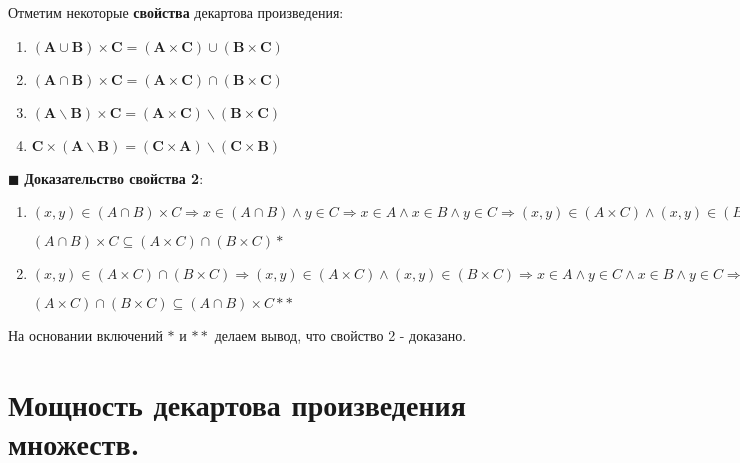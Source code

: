\documentclass[12pt, a4paper, oneside]{article}
\theoremstyle{plain} %
\theoremstyle{definition}
\begin{document}
Отметим некоторые \textbf{свойства} декартова произведения:

\begin{enumerate}
    
    \item \((\textbf{A} \cup \textbf{B}) \times \textbf{C} = (\textbf{A} \times \textbf{C}) \cup (\textbf{B} \times \textbf{C})\)
    
    \item \((\textbf{A} \cap \textbf{B}) \times \textbf{C} = (\textbf{A} \times \textbf{C}) \cap (\textbf{B} \times \textbf{C})\)
    
    \item \((\textbf{A} \backslash \textbf{B}) \times \textbf{C} = (\textbf{A} \times \textbf{C}) \backslash (\textbf{B} \times \textbf{C})\)
    
    \item \(\textbf{C} \times  (\textbf{A} \backslash \textbf{B}) = (\textbf{C} \times \textbf{A}) \backslash (\textbf{C} \times \textbf{B})\)
    
\end{enumerate}


\(\blacksquare\) \textbf{Доказательство свойства 2}:
\begin{enumerate}
    
\item \((x, y) \in (A \cap B) \times C \Longrightarrow x \in (A \cap B) \wedge y \in C \Longrightarrow x \in A \wedge x \in B \wedge y \in C \Longrightarrow (x, y) \in (A \times C) \wedge (x, y) \in (B \times C) \Longrightarrow (x, y) \in (A \times C) \cap (B \times C).\) 


\((A  \cap B) \times C  \subseteq (A \times C) \cap (B \times C) \ast\) 

\item \((x, y) \in (A \times C) \cap (B \times C) \Longrightarrow (x, y) \in (A \times C) \wedge (x, y) \in (B \times C) \Longrightarrow x \in A \wedge y \in C \wedge x \in B \wedge y \in C \Longrightarrow x \in (A \cap B) \wedge y \in C \Longrightarrow (x, y) \in (A  \cap B) \times C.\) 


\((A \times C) \cap (B \times C) \subseteq (A  \cap B) \times C  \ast \ast \) 

\end{enumerate}

На основании включений \(\ast\)  и \(\ast \ast\)  делаем вывод, что свойство 2 - доказано. 

\section{Мощность декартова произведения множеств.}
\end{document}

